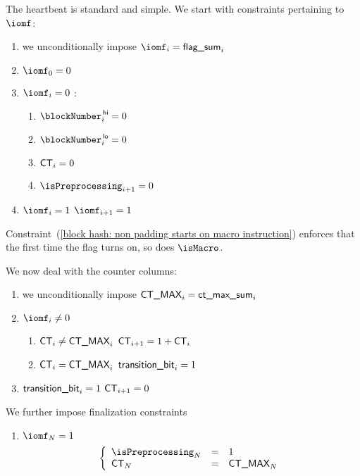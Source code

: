 The heartbeat is standard and simple. We start with constraints pertaining to $\iomf$:
\begin{enumerate}
	\item we unconditionally impose $\iomf _{i} = \locFlagSum _{i}$
	\item $\iomf_{0} = 0$
	\item \If $\iomf_{i} = 0$ \Then:
	\begin{enumerate}
		\item $\blockNumber\high _{i} = 0$ 
		\item $\blockNumber\low  _{i} = 0$  
		\item $\textsf{CT} _{i} = 0$
		\item \label{block hash: non padding starts on macro instruction} $\isPreprocessing _{i + 1} = 0$
	\end{enumerate}
	\item \If $\iomf_{i} = 1$ \Then $\iomf _{i + 1} = 1$
\end{enumerate}
\saNote{}
Constraint~(\ref{block hash: non padding starts on macro instruction}) enforces that the first time
the \iomf{} flag turns on, so does $\isMacro$.

\noindent We now deal with the counter columns:
\begin{enumerate}[resume]
	\item we unconditionally impose $\textsf{CT\_MAX} _{i} = \textsf{ct\_max\_sum} _{i}$
	\item \If $\iomf _{i} \neq 0$ \Then
		\begin{enumerate}
			\item \If $\textsf{CT} _{i} \neq \textsf{CT\_MAX} _{i}$ \Then $\textsf{CT} _{i + 1} = 1 + \textsf{CT} _{i}$
			\item \If $\textsf{CT} _{i} =    \textsf{CT\_MAX} _{i}$ \Then $\textsf{transition\_bit} _{i} = 1$
		\end{enumerate}
	\item \If $\textsf{transition\_bit} _{i} = 1$ \Then $\textsf{CT} _{i + 1} = 0$
\end{enumerate}
We further impose finalization constraints
\begin{enumerate}[resume]
	\item \If $\iomf _{N} = 1$ \Then
		\[
			\left\{ \begin{array}{lcl}
				\isPreprocessing _{N} & = & 1           \\
				\ct              _{N} & = & \maxCt _{N} \\
			\end{array} \right.
		\]
\end{enumerate}
